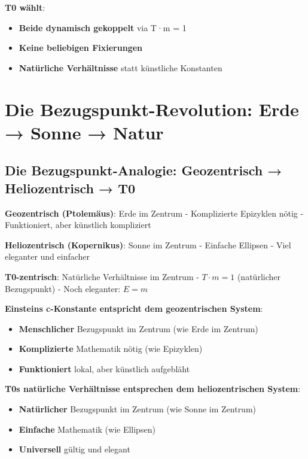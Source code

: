 \documentclass[12pt,a4paper]{article}
\newcommand{\Tfield}{T}
\begin{document}
	\textbf{T0 wählt}:
	\begin{itemize}
		\item \textbf{Beide dynamisch gekoppelt} via T·m = 1
		\item \textbf{Keine beliebigen Fixierungen}
		\item \textbf{Natürliche Verhältnisse} statt künstliche Konstanten
	\end{itemize}
	
	\section{Die Bezugspunkt-Revolution: Erde → Sonne → Natur}
	
	\subsection{Die Bezugspunkt-Analogie: Geozentrisch → Heliozentrisch → T0}
	
	\begin{tcolorbox}[colback=blue!5!white,colframe=blue!75!black,title=Die Bezugspunkt-Revolution: Von Erde → Sonne → Natur]
		\textbf{Geozentrisch (Ptolemäus)}: Erde im Zentrum
		- Komplizierte Epizyklen nötig
		- Funktioniert, aber künstlich kompliziert
		
		\textbf{Heliozentrisch (Kopernikus)}: Sonne im Zentrum  
		- Einfache Ellipsen
		- Viel eleganter und einfacher
		
		\textbf{T0-zentrisch}: Natürliche Verhältnisse im Zentrum
		- $\Tfield \cdot m = 1$ (natürlicher Bezugspunkt)
		- Noch eleganter: $E = m$
	\end{tcolorbox}
	
	\textbf{Einsteins c-Konstante entspricht dem geozentrischen System}:
	\begin{itemize}
		\item \textbf{Menschlicher} Bezugspunkt im Zentrum (wie Erde im Zentrum)
		\item \textbf{Komplizierte} Mathematik nötig (wie Epizyklen)
		\item \textbf{Funktioniert} lokal, aber künstlich aufgebläht
	\end{itemize}
	
	\textbf{T0s natürliche Verhältnisse entsprechen dem heliozentrischen System}:
	\begin{itemize}
		\item \textbf{Natürlicher} Bezugspunkt im Zentrum (wie Sonne im Zentrum)
		\item \textbf{Einfache} Mathematik (wie Ellipsen)
		\item \textbf{Universell} gültig und elegant
	\end{itemize}
	
\end{document}
